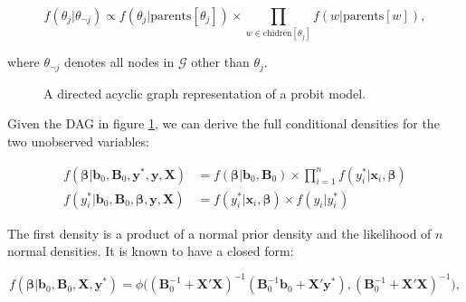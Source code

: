 \documentclass[11pt,a4paper]{article}
\newcommand{\f}{\mathit{f}}
\begin{document}
\begin{equation}
\f(\theta_j | \theta_{\neg j}) \propto \f(\theta_j | \mathrm{parents}[\theta_j]) \times \prod_{w \in \mathrm{chidren}[\theta_j]} \f(w|\mathrm{parents}[w]),
\end{equation}

where $\theta_{\neg j}$ denotes all nodes in $\mathcal{G}$ other than $\theta_j$. 


\begin{figure}[!ht]
\centering


\caption{A directed acyclic graph representation of a probit model.} \label{fig:ProbitDAG}
\end{figure}

\newpage 

Given the DAG in figure \ref{fig:ProbitDAG}, we can derive the full conditional densities for the two unobserved variables: 

\begin{equation}
\begin{split}
\f(\boldsymbol{\beta} | \mathbf{b}_0, \mathbf{B}_0, \mathbf{y}^{*}, \mathbf{y}, \mathbf{X} ) &= 
	\f(\boldsymbol{\beta} | \mathbf{b}_0, \mathbf{B}_0) \times \prod_{i=1}^{n} \f(y_i^{*}|\mathbf{x}_i, \boldsymbol{\beta})\\
\f( y_i^{*} | \mathbf{b}_0, \mathbf{B}_0, \boldsymbol{\beta}, \mathbf{y}, \mathbf{X} ) &= 
	\f(y^{*}_i | \mathbf{x}_i, \boldsymbol{\beta}) \times \f(y_i | y^{*}_i) 
\end{split}
\end{equation}
	
The first density is a product of a normal prior density and the likelihood of $n$ normal densities. It is known to have a closed form:

\begin{equation}
	\f(\boldsymbol{\beta} | \mathbf{b}_0, \mathbf{B}_0, \mathbf{X}, \mathbf{y}^{*}) = 
		\phi \bigg (  (\mathbf{B}_0^{-1} + \mathbf{X}'\mathbf{X})^{-1} (\mathbf{B}_0^{-1} \mathbf{b}_0 + \mathbf{X}'\mathbf{y}^{*}), (\mathbf{B}_0^{-1} + \mathbf{X}'\mathbf{X})^{-1} \bigg ),
\end{equation} 
\end{document}
